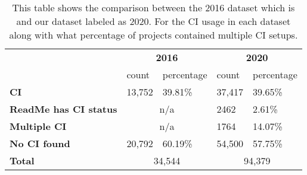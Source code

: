 \begin{table}[!ht]
    \begin{tabular}{l|l|l|l|l|}
    \cline{2-5}
                                                        & \multicolumn{2}{c|}{\textbf{2016}} & \multicolumn{2}{c|}{\textbf{2020}} \\ \cline{2-5} 
                                                        & count      & percentage             & count         & percentage         \\ \hline
    \multicolumn{1}{|l|}{\textbf{CI}}                   & 13,752     & 39.81\%               & 37,417        & 39.65\%            \\ \hline
    \multicolumn{1}{|l|}{\textbf{ReadMe has CI status}} & \multicolumn{2}{c|}{n/a}           & 2462          & 2.61\%             \\ \hline
    \multicolumn{1}{|l|}{\textbf{Multiple CI}}          & \multicolumn{2}{c|}{n/a}           & 1764          & 14.07\%            \\ \hline
    \multicolumn{1}{|l|}{\textbf{No CI found}}          & 20,792     & 60.19\%               & 54,500        & 57.75\%            \\ \hline
    \multicolumn{1}{|l|}{\textbf{Total}}                & \multicolumn{2}{c|}{34,544}        & \multicolumn{2}{c|}{94,379}             \\ \hline

    \end{tabular}
    \label{table:comparison_dataset}

    \caption{This table shows the comparison between the 2016 dataset which is\citet{Hilton2016} and our dataset labeled as 2020. For the CI usage in each dataset along with what percentage of projects contained multiple CI setups.}
\end{table}